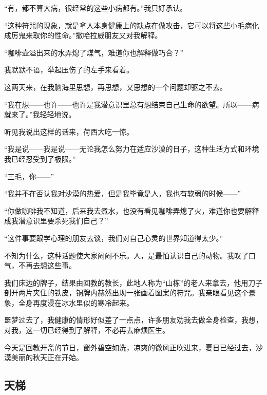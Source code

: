 \par “有，都不算大病，很经常的这些小病都有。”我只好承认。
\par “这种符咒的现象，就是拿人本身健康上的缺点在做攻击，它可以将这些小毛病化成厉鬼来取你的性命。”撒哈拉威朋友又对我解释。
\par “咖啡壶溢出来的水弄熄了煤气，难道你也解释做巧合？”
\par 我默默不语，举起压伤了的左手来看着。
\par 这两天来，在我脑海里思想，再思想，又思想的一个问题却驱之不去。
\par “我在想——也许——也许是我潜意识里总有想结束自己生命的欲望。所以——病就来了。”我轻轻地说。
\par 听见我说出这样的话来，荷西大吃一惊。
\par “我是说——我是说——无论我怎么努力在适应沙漠的日子，这种生活方式和环境我已经忍受到了极限。”
\par “三毛，你——”
\par “我并不在否认我对沙漠的热爱，但是我毕竟是人，我也有软弱的时候——”
\par “你做咖啡我不知道，后来我去煮水，也没有看见咖啡弄熄了火，难道你也要解释成我潜意识里要杀死我们自己？”
\par “这件事要跟学心理的朋友去谈，我们对自己心灵的世界知道得太少。”
\par 不知为什么，这种话题使大家闷闷不乐。人，是最怕认识自己的动物。我叹了口气，不再去想这些事。
\par 我们床边的牌子，结果由回教的教长，此地人称为“山栋”的老人来拿去，他用刀子剖开两片夹住的铁皮，铜牌内赫然出现一张画着图案的符咒。我亲眼看见这个景象，全身再度浸在冰水里似的寒冷起来。
\par 噩梦过去了，我健康的情形好似差了一点点，许多朋友劝我去做全身检查，我想，对我，这一切已经得到了解释，不必再去麻烦医生。
\par 今天是回教开斋的节日，窗外碧空如洗，凉爽的微风正吹进来，夏日已经过去，沙漠美丽的秋天正在开始。

\subsection{天梯}

